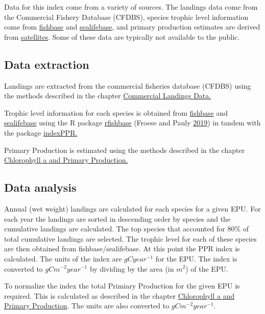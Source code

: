 \documentclass[
]{book}
\begin{document}
Data for this index come from a variety of sources. The landings data come from the Commercial Fishery Database (CFDBS), species trophic level information come from \href{http://fishbase.de}{fishbase} and \href{http://sealifebase.ca}{sealifebase}, and primary production estimates are derived from \href{https://noaa-edab.github.io/tech-doc/chl-pp.html}{satellites}. Some of these data are typically not available to the public.

\hypertarget{data-extraction}{%
\subsection{Data extraction}\label{data-extraction}}

Landings are extracted from the commercial fisheries database (CFDBS) using the methods described in the chapter \href{https://noaa-edab.github.io/tech-doc/comdat.html}{Commercial Landings Data.}

Trophic level information for each species is obtained from \href{http://fishbase.de}{fishbase} and \href{http://sealifebase.ca}{sealifebase} using the R package \href{https://github.com/ropensci/rfishbase}{rfishbase} (Froese and Pauly \protect\hyperlink{ref-froese2019fishbase}{2019}) in tandem with the package \href{https://github.com/andybeet/indexPPR/}{indexPPR.}

Primary Production is estimated using the methods described in the chapter \href{https://noaa-edab.github.io/tech-doc/chl-pp.html}{Chlorophyll a and Primary Production.}

\hypertarget{data-analysis}{%
\subsection{Data analysis}\label{data-analysis}}

Annual (wet weight) landings are calculated for each species for a given EPU. For each year the landings are sorted in descending order by species and the cumulative landings are calculated. The top species that accounted for 80\% of total cumulative landings are selected. The trophic level for each of these species are then obtained from fishbase/sealifebase. At this point the PPR index is calculated. The units of the index
are \(gCyear^{-1}\) for the EPU. The index is converted to \(gCm^{-2}year^{-1}\) by dividing by the area (in \(m^2\)) of the EPU.

To normalize the index the total Primiary Production for the given EPU is required. This is calculated as described in the chapter \href{https://noaa-edab.github.io/tech-doc/chl-pp.html}{Chlorophyll a and Primary Production}. The units are also converted to \(gCm^{-2}year^{-1}\).
\end{document}
